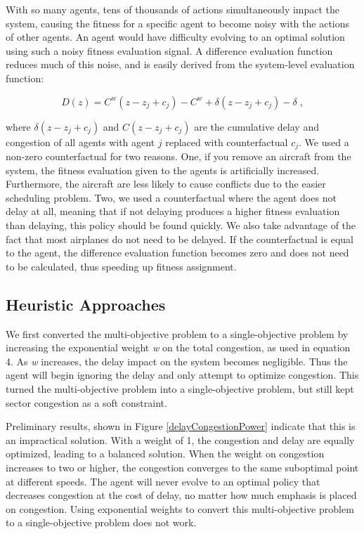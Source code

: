 \documentclass{sig-alternate}
\begin{document}
With so many agents, tens of thousands of actions simultaneously impact the system, causing the fitness for a specific agent to become noisy with the actions of other agents. An agent would have difficulty evolving to an optimal solution using such a noisy fitness evaluation signal. A difference evaluation function reduces much of this noise, and is easily derived from the system-level evaluation function:

\begin{equation}
D(z) = C^w(z-z_j + c_j) - C^w + \delta(z-z_j + c_j) - \delta\;,
\end{equation}

where \textit{$\delta(z-z_j + c_j)$} and \textit{$C(z-z_j + c_j)$} are the cumulative delay and congestion of all agents with agent $j$ replaced with counterfactual \textit{$c_j$}. We used a non-zero counterfactual for two reasons. One, if you remove an aircraft from the system, the fitness evaluation given to the agents is artificially increased. Furthermore, the aircraft are less likely to cause conflicts due to the easier scheduling problem. Two, we used a counterfactual where the agent does not delay at all, meaning that if not delaying produces a higher fitness evaluation than delaying, this policy should be found quickly. We also take advantage of the fact that most airplanes do not need to be delayed. If the counterfactual is equal to the agent, the difference evaluation function becomes zero and does not need to be calculated, thus speeding up fitness assignment.

\subsection{Heuristic Approaches}
We first converted the multi-objective problem to a single-objective problem by increasing the exponential weight \textit{w} on the total congestion, as used in equation 4. As \textit{w} increases, the delay impact on the system becomes negligible. Thus the agent will begin ignoring the delay and only attempt to optimize congestion. This turned the multi-objective problem into a single-objective problem, but still kept sector congestion as a soft constraint.

Preliminary results, shown in Figure \ref{delayCongestionPower} indicate that this is an impractical solution. With a weight of 1, the congestion and delay are equally optimized, leading to a balanced solution. When the weight on congestion increases to two or higher, the congestion converges to the same suboptimal point at different speeds. The agent will never evolve to an optimal policy that decreases congestion at the cost of delay, no matter how much emphasis is placed on congestion. Using exponential weights to convert this multi-objective problem to a single-objective problem does not work.
\end{document}
